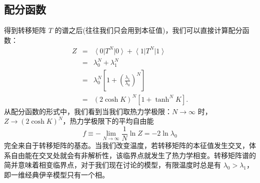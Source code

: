 \documentclass[UTF8]{ctexart}
\begin{document}
\subsection*{配分函数}
\noindent
得到转移矩阵 $T$ 的谱之后(往往我们只会用到本征值)，我们可以直接计算配分函数：
\begin{eqnarray}
	Z & = & \left\langle 0\right|T^{N}\left|0\right\rangle +\left\langle 1\right|T^{N}\left|1\right\rangle \nonumber \\
 	& = & \lambda_{0}^{N}+\lambda_{1}^{N}\nonumber \\
 	& = & \lambda_{0}^{N}\left[1+\left(\frac{\lambda_{1}}{\lambda_{0}}\right)^{N}\right]\nonumber \\
 	& = & \left(2\cosh K\right)^{N}\left[1+\tanh^{N}K\right].
\end{eqnarray}
从配分函数的形式中，我们看到当我们取热力学极限：$N\rightarrow\infty$ 时， $Z\rightarrow\left(2\cosh K\right)^{N}$，热力学极限下的平均自由能
\begin{equation}
	f \equiv -\lim_{N\rightarrow\infty}\frac{1}{N}\ln Z=-2\ln\lambda_{0}
\end{equation}
完全来自于转移矩阵的基态。当我们改变温度，若转移矩阵的本征值发生交叉，体系自由能在交叉处就会有非解析性，该临界点就发生了热力学相变。转移矩阵谱的简并意味着相变临界点，对于我们现在讨论的模型，有限温度时总是有 $\lambda_{0}>\lambda_{1}$，即一维经典伊辛模型只有一个相。
\end{document}
